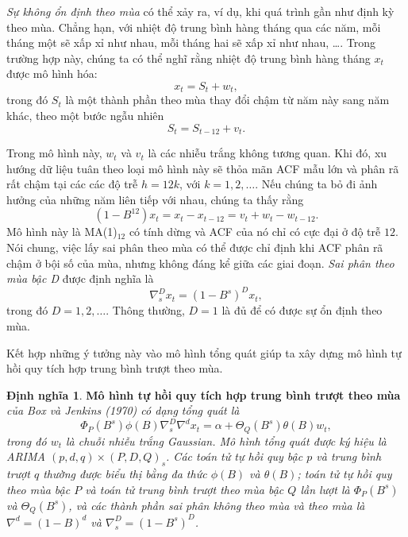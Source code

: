 \documentclass[12pt, a4paper,oneside]{book}
\theoremstyle{definition}
\newtheorem{dn}[theo]{Định nghĩa}
\begin{document}
\textit{Sự không ổn định theo mùa} có thể xảy ra, ví dụ, khi quá trình gần như định kỳ theo mùa. Chẳng hạn, với nhiệt độ trung bình hàng tháng qua các năm, mỗi tháng một sẽ xấp xỉ như nhau, mỗi tháng hai sẽ xấp xỉ như nhau, \dots. Trong trường hợp này, chúng ta có thể nghĩ rằng nhiệt độ trung bình hàng tháng $x_{t}$ được mô hình hóa:
\begin{equation}
x_{t}=S_{t} +w_{t}, \label{ct1.197}
\end{equation}
trong đó $S_{t}$ là một thành phần theo mùa thay đổi chậm từ năm này sang năm khác, theo một bước ngẫu nhiên
\begin{equation}
S_{t}=S_{t-12}+ v_{t}. \label{ct1.198}
\end{equation}

Trong mô hình này, $w_{t}$ và $v_{t}$ là các nhiễu trắng không tương quan. Khi đó, xu hướng dữ liệu tuân theo loại mô hình này sẽ thỏa mãn ACF mẫu lớn và phân rã rất chậm tại các các độ trễ $h = 12k$, với $k = 1, 2, \dots$. Nếu chúng ta bỏ đi ảnh hưởng của những năm liên tiếp với nhau, chúng ta thấy rằng
\begin{equation}
(1-B^{12})x_{t}=x_{t}-x_{t-12}=v_{t}+w_{t}-w_{t-12}. \label{ct1.199}
\end{equation}
Mô hình này là MA(1)$_{12}$ có tính dừng và ACF của nó chỉ có cực đại ở độ trễ $12$. Nói chung, việc lấy sai phân theo mùa có thể được chỉ định khi ACF phân rã chậm ở bội số của mùa, nhưng không đáng kể giữa các giai đoạn. \textit{Sai phân theo mùa bậc D} được định nghĩa là
\begin{equation}
\nabla_{s}^{D}x_{t}=(1-B^{s})^{D}x_{t}, \label{ct1.200}
\end{equation}
trong đó $D = 1, 2, \dots$. Thông thường, $D = 1$ là đủ để có được sự ổn định theo mùa.

Kết hợp những ý tưởng này vào mô hình tổng quát giúp ta xây dựng mô hình tự hồi quy tích hợp trung bình trượt theo mùa.
\begin{dn}\cite{1, 2} \textbf{Mô hình tự hồi quy tích hợp trung bình trượt theo mùa}\textit{ của Box và Jenkins (1970) có dạng tổng quát là
		\begin{equation}
		\Phi_ {P} (B^{s})	\phi(B)\nabla_{s}^{D}\nabla^{d}x_{t}=\alpha + \varTheta_{Q}(B^{s})\theta(B)w_{t}, \label{ct1.201}
		\end{equation}	
		trong đó $w_{t}$ là chuỗi nhiễu trắng Gaussian. Mô hình tổng quát được ký hiệu là ARIMA $(p, d, q) \times (P, D, Q )_{s}$. Các toán tử tự hồi quy bậc $ p $ và trung bình trượt $ q $ thường được biểu thị bằng đa thức $\phi(B)$ và $\theta(B)$; toán tử tự hồi quy theo mùa  bậc $ P $ và toán tử trung bình trượt  theo mùa bậc $ Q $ lần lượt là $\Phi_ {P} (B^{s})$ và $\varTheta_{Q}(B^{s})$, và các thành phần sai phân không theo mùa và theo mùa là  $\nabla^{d}=(1-B)^{d}$ và $\nabla^{D}_{s}=(1-B^{s})^{D}$.}
\end{dn}
\end{document}
